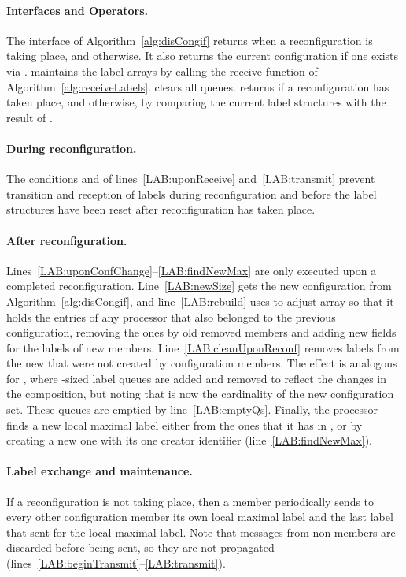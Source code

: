 \documentclass[11pt]{article}
\begin{document}
\paragraph{Interfaces and Operators.}
The  interface of Algorithm~\ref{alg:disCongif}  returns  when a reconfiguration is taking place, and  otherwise. It also returns the current configuration if one exists via .
 maintains the label arrays by calling the receive function of Algorithm~\ref{alg:receiveLabels}.
 clears all  queues.
 returns  if a reconfiguration has taken place, and  otherwise, by comparing the current label structures with the result of .

\paragraph{During reconfiguration.}  The conditions  and   of lines~\ref{LAB:uponReceive} and~\ref{LAB:transmit} prevent transition and reception of labels during reconfiguration and before the label structures have been reset after reconfiguration has taken place.  

\paragraph{After reconfiguration.} Lines~\ref{LAB:uponConfChange}--\ref{LAB:findNewMax} are only executed upon a completed reconfiguration.
Line~\ref{LAB:newSize} gets the new configuration from Algorithm~\ref{alg:disCongif}, and line~\ref{LAB:rebuild} uses  to adjust  array so that it holds the entries of any processor that also belonged to the previous configuration, removing the ones by old removed members and adding new fields for the labels of new  members.
Line~\ref{LAB:cleanUponReconf} removes labels from the new  that were not created by configuration members. 
The effect is analogous for , where -sized label queues are added and removed to reflect the changes in the  composition, but noting that  is now the cardinality of the new configuration set.
These queues are emptied by line~\ref{LAB:emptyQs}.
Finally, the processor finds a new local maximal label either from the ones that it has in , or by creating a new one with its one creator identifier (line~\ref{LAB:findNewMax}).

\paragraph{Label exchange and maintenance.} If a reconfiguration is not taking place, then a member periodically sends to every other configuration member  its own local maximal label and the last label that  sent for the local maximal label.
Note that messages from non-members are discarded before being sent, so they are not propagated (lines~\ref{LAB:beginTransmit}--\ref{LAB:transmit}).
\end{document}
